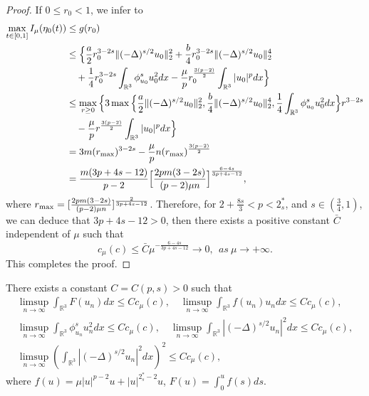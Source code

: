 \documentclass[reqno]{amsart}
\begin{document}
\begin{proof}
If $0 \leq r_0<1$, we infer to
\begin{align*}
\max_{t\in[0,1]} I_\mu(\eta_0(t))&\leq  g(r_0)\\
&\leq  \Big\{\frac{a}{2}r^{3-2s}_0\|(-\Delta)^{s/2}u_0\|^2_2
 +\frac{b}{4}r^{3-2s}_0\|(-\Delta)^{s/2}u_0\|^4_2\\
&\quad +\frac{1}{4}r^{3-2s}_0\int_{\mathbb{R}^3}\phi^s_{u_0}u^2_0dx
 -\frac{\mu}{p}r^{\frac{3(p-2)}{2}}_0\int_{\mathbb{R}^3}|u_0|^pdx\Big\}\\
&\leq  \max_{r\geq 0}\Big\{3\max\Big\{\frac{a}{2}\|(-\Delta)^{s/2}u_0\|^2_2, 
 \frac{b}{4}\|(-\Delta)^{s/2}u_0\|^4_2,
\frac{1}{4}\int_{\mathbb{R}^3}\phi^s_{u_0}u^2_0dx  \Big\}r^{3-2s}\\
&\quad -\frac{\mu}{p}r^{\frac{3(p-2)}{2}}\int_{\mathbb{R}^3}|u_0|^pdx\Big\}\\
&= 3m(r_{\rm max})^{3-2s}-\frac{\mu}{p}n(r_{\rm max})^{\frac{3(p-2)}{2}}\\
&= \frac{m(3p+4s-12)}{p-2}\Big[\frac{2pm(3-2s)}{(p-2)\mu n}\Big]^{\frac{6-4s}{3p+4s-12}},
\end{align*}
where $r_{\rm max}=[\frac{2pm(3-2s)}{(p-2)\mu n}]^{\frac{2}{3p+4s-12}}$.
Therefore, for $2+\frac{8s}{3}<p<2^*_s$, and $s\in{(\frac{3}{4}, 1)}$, we can deduce 
that $3p+4s-12>0$, then there exists a positive constant $\bar{C}$ independent of
 $\mu$ such that
$$
c_\mu (c)\leq \bar{C}{\mu}^{-\frac{6-4s}{3p+4s-12}}\to 0, ~~as~\mu\to +\infty.
$$
This completes the proof.
\end{proof}

\begin{lemma}\label{lem5.8} 
There exists  a constant $C=C(p,s)>0$ such that
\begin{gather*}
\limsup_{n\to \infty} \int_{\mathbb{R}^3}F(u_n)dx\leq C c_\mu(c), \quad
\limsup_{n\to \infty} \int_{\mathbb{R}^3}f(u_n){u_n}dx\leq C c_\mu(c), \\
\limsup_{n\to \infty} \int_{\mathbb{R}^3}\phi^s_{u_n}u^2_ndx\leq C c_\mu(c),\quad 
\limsup_{n\to \infty} \int_{\mathbb{R}^3}|(-\Delta)^{s/2}u_n|^2dx\leq C c_\mu(c),\\
\limsup_{n\to \infty} (\int_{\mathbb{R}^3}|(-\Delta)^{s/2}u_n|^2dx)^2\leq C c_\mu(c),
\end{gather*}
where $f(u)=\mu|u|^{p-2}u+|u|^{2^*_s-2}u$, $F(u)=\int^u_0 f(s)ds$.
\end{lemma}
\end{document}
